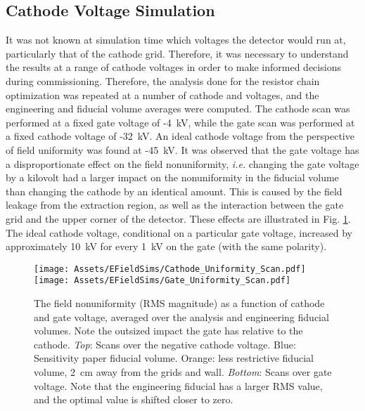 \subsection{Cathode Voltage Simulation}
It was not known at simulation time which voltages the detector would run at, particularly that of the cathode grid.
Therefore, it was necessary to understand the results at a range of cathode voltages in order to make informed decisions during commissioning.
Therefore, the analysis done for the resistor chain optimization was repeated at a number of cathode and voltages, and the engineering and fiducial volume averages were computed.
The cathode scan was performed at a fixed gate voltage of -4~kV, while the gate scan was performed at a fixed cathode voltage of -32~kV.
An ideal cathode voltage from the perspective of field uniformity was found at -45~kV.
It was observed that the gate voltage has a disproportionate effect on the field nonuniformity, \textit{i.e.} changing the gate voltage by a kilovolt had a larger impact on the nonuniformity in the fiducial volume than changing the cathode by an identical amount.
This is caused by the field leakage from the extraction region, as well as the interaction between the gate grid and the upper corner of the detector.
These effects are illustrated in Fig. \ref{fig:cathode_uniformity}.
The ideal cathode voltage, conditional on a particular gate voltage, increased by approximately 10~kV for every 1~kV on the gate (with the same polarity).

\begin{figure}
    \centering
    \texttt{[image: Assets/EFieldSims/Cathode\_Uniformity\_Scan.pdf]}
     \texttt{[image: Assets/EFieldSims/Gate\_Uniformity\_Scan.pdf]}
    \caption[The field nonuniformity (RMS magnitude) as a function of cathode and gate voltage, averaged over the analysis and engineering fiducial volumes.]%
    {The field nonuniformity (RMS magnitude) as a function of cathode and gate voltage, averaged over the analysis and engineering fiducial volumes.
    Note the outsized impact the gate has relative to the cathode.
    \textit{Top}: Scans over the negative cathode voltage. 
    Blue: Sensitivity paper\cite{akerib_projected_2020} fiducial volume.
    Orange: less restrictive fiducial volume, 2~cm away from the grids and wall.
    \textit{Bottom}: Scans over gate voltage. 
    Note that the engineering fiducial has a larger RMS value, and the optimal value is shifted closer to zero.
    }
    \label{fig:cathode_uniformity}
\end{figure}
\afterpage{\FloatBarrier}
